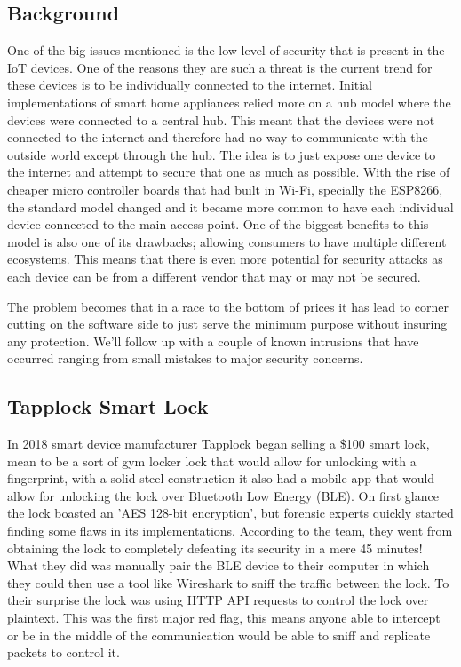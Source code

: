 \documentclass[acmlarge]{acmart}
\begin{document}
\subsection{Background}

One of the big issues mentioned is the low level of security that is present in the IoT devices. One of the reasons they are such a threat is the current trend for these devices is to be individually connected to the internet. Initial implementations of smart home appliances relied more on a hub model where the devices were connected to a central hub. This meant that the devices were not connected to the internet and therefore had no way to communicate with the outside world except through the hub. The idea is to just expose one device to the internet and attempt to secure that one as much as possible. With the rise of cheaper micro controller boards that had built in Wi-Fi, specially the ESP8266, the standard model changed and it became more common to have each individual device connected to the main access point. One of the biggest benefits to this model is also one of its drawbacks; allowing consumers to have multiple different ecosystems. This means that there is even more potential for security attacks as each device can be from a different vendor that may or may not be secured.  

The problem becomes that in a race to the bottom of prices it has lead to corner cutting on the software side to just serve the minimum purpose without insuring any protection. We'll follow up with a couple of known intrusions that have occurred ranging from small mistakes to major security concerns. 


\subsection{Tapplock Smart Lock}

In 2018 smart device manufacturer Tapplock began selling a \$100 smart lock, mean to be a sort of gym locker lock that would allow for unlocking with a fingerprint, with a solid steel construction it also had a mobile app that would allow for unlocking the lock over Bluetooth Low Energy (BLE).
On first glance the lock boasted an 'AES 128-bit encryption', but forensic experts quickly started finding some flaws in its implementations. According to the team, they went from obtaining the lock to completely defeating its security in a mere 45 minutes! \cite{Ken_2018}
What they did was manually pair the BLE device to their computer in which they could then use a tool like Wireshark to sniff the traffic between the lock. To their surprise the lock was using HTTP API requests to control the lock over plaintext. This was the first major red flag, this means anyone able to intercept or be in the middle of the communication would be able to sniff and replicate packets to control it.





\end{document}
